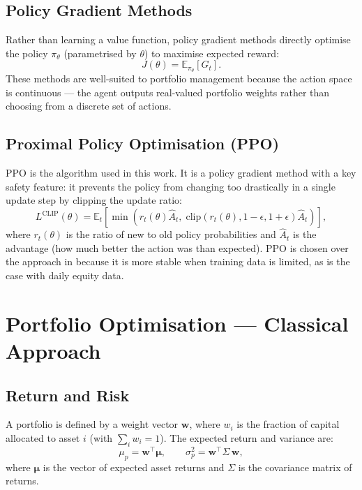 \documentclass[12pt,a4paper]{article}
\begin{document}
\subsection{Policy Gradient Methods}

Rather than learning a value function, policy gradient methods directly
optimise the policy $\pi_\theta$ (parametrised by $\theta$) to maximise
expected reward:
\begin{equation}
  J(\theta) = \mathbb{E}_{\pi_\theta}[G_t].
\end{equation}
These methods are well-suited to portfolio management because the action
space is continuous --- the agent outputs real-valued portfolio weights
rather than choosing from a discrete set of actions.

\subsection{Proximal Policy Optimisation (PPO)}

PPO \citep{schulman2017proximal} is the algorithm used in this work. It
is a policy gradient method with a key safety feature: it prevents the
policy from changing too drastically in a single update step by clipping
the update ratio:
\begin{equation}
  L^{\text{CLIP}}(\theta) = \mathbb{E}_t\!\left[
    \min\!\left(
      r_t(\theta)\hat{A}_t,\;
      \text{clip}(r_t(\theta), 1{-}\epsilon, 1{+}\epsilon)\hat{A}_t
    \right)
  \right],
  \label{eq:ppo}
\end{equation}
where $r_t(\theta)$ is the ratio of new to old policy probabilities and
$\hat{A}_t$ is the advantage (how much better the action was than
expected). PPO is chosen over the approach in \citet{jiang2017deep}
because it is more stable when training data is limited, as is the case
with daily equity data.

\section{Portfolio Optimisation --- Classical Approach}
\label{sec:classical}

\subsection{Return and Risk}

A portfolio is defined by a weight vector $\mathbf{w}$, where $w_i$
is the fraction of capital allocated to asset $i$ (with
$\sum_i w_i = 1$). The expected return and variance are:
\begin{equation}
  \mu_p = \mathbf{w}^{\!\top} \boldsymbol{\mu}, \qquad
  \sigma_p^2 = \mathbf{w}^{\!\top} \Sigma\, \mathbf{w},
\end{equation}
where $\boldsymbol{\mu}$ is the vector of expected asset returns and
$\Sigma$ is the covariance matrix of returns.
\end{document}
